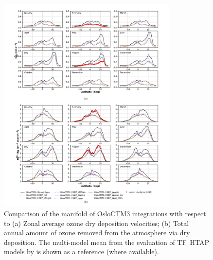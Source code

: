 \documentclass[gmd, manuscript]{copernicus}
\begin{document}
\appendixfigures
\begin{figure}[!htbp]
  \includegraphics[width=0.8\textwidth]{fig10}
  \caption{Comparison of the manifold of OsloCTM3 integrations with respect to (a) Zonal average ozone dry deposition velocities; (b) Total annual amount of ozone removed from the atmosphere via dry deposition. The multi-model mean from the evaluation of TF~HTAP models by \citet{ACP:Hardacre2015} is shown as a reference (where available).}
  \label{fig:mmm_drydep_season}
\end{figure}


\noappendix       %



\end{document}
